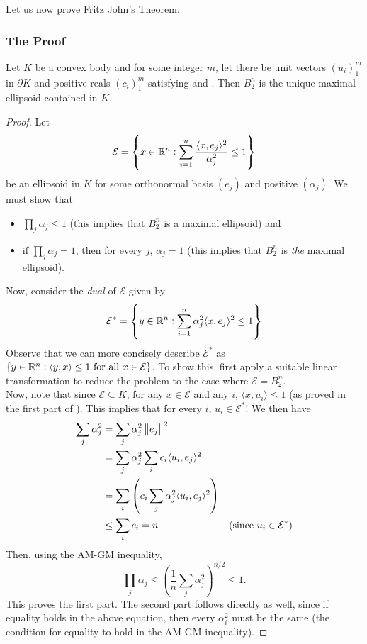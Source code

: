 Let us now prove Fritz John's Theorem.

\subsubsection{The Proof}

\begin{lemma}
\label{fritz johns theorem part 1}
Let $K$ be a convex body and for some integer $m$, let there be unit vectors $(u_i)_1^m$ in $\partial K$ and positive reals $(c_i)_1^m$ satisfying  and . Then $B_2^n$ is the unique maximal ellipsoid contained in $K$.
\end{lemma}
\begin{proof}
Let
\[ \mathcal{E} = \left\{x\in\mathbb{R}^n:\sum_{i=1}^n \frac{\langle x,e_j\rangle^2}{\alpha_j^2}\leq 1\right\} \]
be an ellipsoid in $K$ for some orthonormal basis $(e_j)$ and positive $(\alpha_j)$. We must show that
\begin{itemize}
    \item $\prod_j \alpha_j\leq 1$ (this implies that $B_2^n$ is a maximal ellipsoid) and
    \item if $\prod_j \alpha_j = 1$, then for every $j$, $\alpha_j = 1$ (this implies that $B_2^n$ is \textit{the} maximal ellipsoid).
\end{itemize}
Now, consider the \textit{dual} of $\mathcal{E}$ given by
\[ \mathcal{E}^* = \left\{y\in\mathbb{R}^n:\sum_{i=1}^n \alpha_j^2\langle x,e_j\rangle^2 \leq 1\right\} \]
Observe that we can more concisely describe $\mathcal{E}^*$ as $\{y\in\mathbb{R}^n:\langle y,x\rangle\leq 1\text{ for all }x\in\mathcal{E}\}$. To show this, first apply a suitable linear transformation to reduce the problem to the case where $\mathcal{E}=B_2^n$.\\
Now, note that since $\mathcal{E}\subseteq K$, for any $x\in \mathcal{E}$ and any $i$, $\langle x,u_i\rangle\leq 1$ (as proved in the first part of ). This implies that for every $i$, $u_i\in\mathcal{E}^*$! We then have
\begin{align*}
    \sum_j \alpha_j^2 &= \sum_j \alpha_j^2 \left\lVert e_j\right\rVert^2 \\
    &= \sum_j \alpha_j^2 \sum_i c_i \langle u_i,e_j\rangle^2 \\
    &= \sum_i \left(c_i \sum_j \alpha_j^2\langle u_i,e_j\rangle^2 \right) \\
    &\leq \sum_i c_i = n & (\text{since }u_i\in\mathcal{E}^*)
\end{align*}
Then, using the AM-GM inequality,
\[ \prod_j \alpha_j \leq \left(\frac{1}{n}\sum_j \alpha_j^2\right)^{n/2} \leq 1. \]
This proves the first part. The second part follows directly as well, since if equality holds in the above equation, then every $\alpha_i^2$ must be the same (the condition for equality to hold in the AM-GM inequality).
\end{proof}

